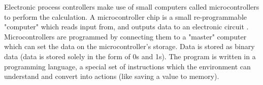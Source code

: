 \documentclass[a4]{report}
\begin{document}
	Electronic process controllers make use of small computers called microcontrollers to perform the calculation. A microcontroller chip is a small re-programmable "computer" which reads input from, and outputs data to an electronic circuit \cite{backwhatismc}. Microcontrollers are programmed by connecting them to a "master" computer which can set the data on the microcontroller's storage. Data is stored as binary data (data is stored solely in the form of 0s and 1s). The program is written in a programming language, a special set of instructions which the environment can understand and convert into actions (like saving a value to memory). \newline \newline \noindent
	



	
\end{document}
